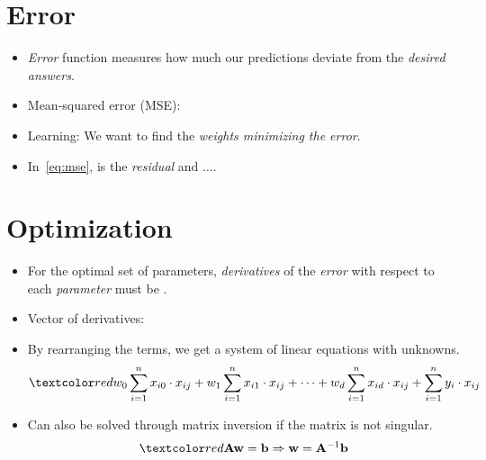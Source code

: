 \documentclass[
	title={Linear Regression}
]{cs584notes}
\begin{document}
\section{Error}\label{sec:error}
\begin{itemize}
	\item \emph{Error} function measures how much our predictions deviate from the \emph{desired answers}.
	\item Mean-squared error (MSE):
	\item Learning: We want to find the \emph{weights minimizing the error}.
	\item In~\eqref{eq:mse},  is the \emph{residual\label{dfn:residual}} and $\dots$.
\end{itemize}

\section{Optimization}\label{sec:optimization}
\begin{itemize}
	\item For the optimal set of parameters, \emph{derivatives} of the \emph{error} with respect to each \emph{parameter} must be .
	\item Vector of derivatives:
	\item By rearranging the terms, we get a system of linear equations with  unknowns.
	\[ \data{ w_{0}\sum_{i=1}^{n} x_{i0}\cdot x_{ij} + w_{1}\sum_{i=1}^{n} x_{i1}\cdot x_{ij} + \dots + w_{d}\sum_{i=1}^{n} x_{id}\cdot x_{ij} + \sum_{i=1}^{n} y_{i}\cdot x_{ij} } \]
	\item Can also be solved through matrix inversion if the matrix is not singular.
	\[ \data{ \vec{A}\vec{w} = \vec{b} \Rightarrow \vec{w} = \vec{A}^{-1}\vec{b} } \]
\end{itemize}
\end{document}
